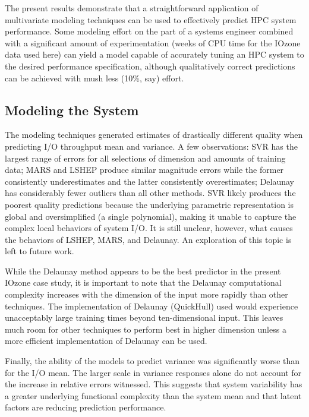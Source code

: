 \documentclass{scspaperproc}
\theoremstyle{scsthe}
\begin{document}
The present results demonstrate that a straightforward application of
multivariate modeling techniques can be used to effectively predict
HPC system performance. Some modeling effort on the part of a systems
engineer combined with a significant amount of experimentation (weeks
of CPU time for the IOzone data used here) can yield a model capable
of accurately tuning an HPC system to the desired performance
specification, although qualitatively correct predictions can be
achieved with mush less (10\%, say) effort.

\vspace{-10pt}
\subsection{Modeling the System}
\vspace{-10pt}
The modeling techniques generated estimates of drastically different
quality when predicting I/O throughput mean and variance. A few
observations: SVR has the largest range of errors for all selections
of dimension and amounts of training data; MARS and LSHEP produce
similar magnitude errors while the former consistently underestimates
and the latter consistently overestimates; Delaunay has considerably
fewer outliers than all other methods. SVR likely produces the poorest
quality predictions because the underlying parametric representation
is global and oversimplified (a single polynomial), making it unable
to capture the complex local behaviors of system I/O. It is still
unclear, however, what causes the behaviors of LSHEP, MARS, and
Delaunay. An exploration of this topic is left to future work.

While the Delaunay method appears to be the best predictor in the
present IOzone case study, it is important to note that the Delaunay
computational complexity increases with the dimension of the input
more rapidly than other techniques. The implementation of Delaunay
(QuickHull) used would experience unacceptably large training times
beyond ten-dimensional input. This leaves much room for other
techniques to perform best in higher dimension unless a more efficient
implementation of Delaunay can be used.

Finally, the ability of the models to predict variance was
significantly worse than for the I/O mean. The larger scale in
variance responses alone do not account for the increase in relative
errors witnessed. This suggests that system variability has a greater
underlying functional complexity than the system mean and that latent
factors are reducing prediction performance.
\end{document}
